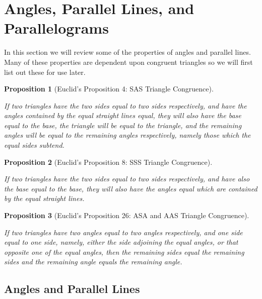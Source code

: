 \documentclass[
]{book}
\newtheorem{proposition}{Proposition}[chapter]
\theoremstyle{definition}
\theoremstyle{definition}
\theoremstyle{definition}
\theoremstyle{definition}
\theoremstyle{remark}
\begin{document}
\hypertarget{angles-parallel-lines-and-parallelograms}{%
\section{Angles, Parallel Lines, and Parallelograms}\label{angles-parallel-lines-and-parallelograms}}

In this section we will review some of the properties of angles and parallel lines. Many of these properties are dependent upon congruent triangles so we will first list out these for use later.

\begin{proposition}[Euclid's Proposition 4: SAS Triangle Congruence]
\protect\hypertarget{prp:unlabeled-div-147}{}\label{prp:unlabeled-div-147}

If two triangles have the two sides equal to two sides respectively, and have the angles contained by the equal straight lines equal, they will also have the base equal to the base, the triangle will be equal to the triangle, and the remaining angles will be equal to the remaining angles respectively, namely those which the equal sides subtend.

\end{proposition}

\begin{proposition}[Euclid's Proposition 8: SSS Triangle Congruence]
\protect\hypertarget{prp:unlabeled-div-148}{}\label{prp:unlabeled-div-148}

If two triangles have the two sides equal to two sides respectively, and have also the base equal to the base, they will also have the angles equal which are contained by the equal straight lines.

\end{proposition}

\begin{proposition}[Euclid's Proposition 26: ASA and AAS Triangle Congruence]
\protect\hypertarget{prp:prop26}{}\label{prp:prop26}

If two triangles have two angles equal to two angles respectively, and one side equal to one side, namely, either the side adjoining the equal angles, or that opposite one of the equal angles, then the remaining sides equal the remaining sides and the remaining angle equals the remaining angle.

\end{proposition}

\hypertarget{angles-and-parallel-lines}{%
\subsection{Angles and Parallel Lines}\label{angles-and-parallel-lines}}
\end{document}
